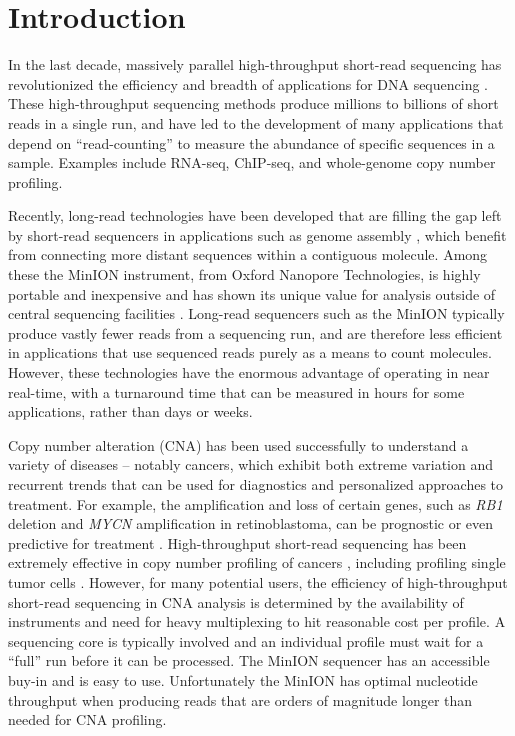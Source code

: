 \chapter{Introduction}
\label{ch1}

In the last decade, massively parallel high-throughput short-read
sequencing has revolutionized the efficiency and breadth of applications
for DNA sequencing \citep{kircher2010high}.  These high-throughput
sequencing methods produce millions to billions of short reads in a
single run, and have led to the development of many applications that
depend on ``read-counting'' to measure the abundance of specific
sequences in a sample. Examples include RNA-seq, ChIP-seq, and
whole-genome copy number profiling.

Recently, long-read technologies have been developed that are filling
the gap left by short-read sequencers in applications such as genome
assembly \citep{jain2018nanopore,loman2015complete}, which benefit from
connecting more distant sequences within a contiguous molecule. Among
these the MinION instrument, from Oxford Nanopore Technologies, is
highly portable and inexpensive and has shown its unique value for
analysis outside of central sequencing facilities \citep{quick2016real}.
Long-read sequencers such as the MinION typically produce vastly fewer
reads from a sequencing run, and are therefore less efficient in
applications that use sequenced reads purely as a means to count
molecules. However, these technologies have the enormous advantage of
operating in near real-time, with a turnaround time that can be measured
in hours for some applications, rather than days or weeks.

Copy number alteration (CNA) has been used successfully to understand a
variety of diseases \citep{fanciulli2010gene} -- notably cancers, which
exhibit both extreme variation and recurrent trends that can be used for
diagnostics and personalized approaches to treatment. For example, the
amplification and loss of certain genes, such as \textit{RB1} deletion
and \textit{MYCN} amplification in retinoblastoma, can be prognostic or
even predictive for treatment \citep{berry2017potential}.
High-throughput short-read sequencing has been extremely effective in
copy number profiling of cancers \citep{chiang2009high}, including
profiling single tumor cells \citep{navin2011tumour}. However, for many
potential users, the efficiency of high-throughput short-read sequencing
in CNA analysis is determined by the availability of instruments and
need for heavy multiplexing to hit reasonable cost per profile. A
sequencing core is typically involved and an individual profile must
wait for a ``full'' run before it can be processed. The MinION sequencer
has an accessible buy-in and is easy to use. Unfortunately the MinION
has optimal nucleotide throughput when producing reads that are orders
of magnitude longer than needed for CNA profiling.

